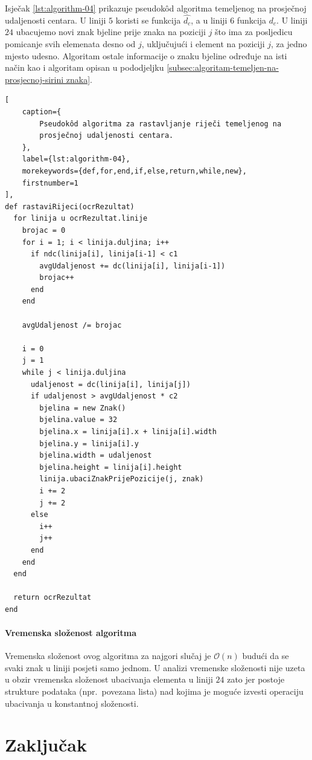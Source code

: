 \documentclass[times, utf8, zavrsni]{fer}
\begin{document}
Isječak \ref{lst:algorithm-04} prikazuje pseudokôd algoritma temeljenog na
prosječnoj udaljenosti centara. U liniji $5$ koristi se funkcija $\hat{d_c}$,
a u liniji $6$ funkcija $d_c$. U liniji $24$ ubacujemo novi znak bjeline prije
znaka na poziciji $j$ što ima za posljedicu pomicanje svih elemenata desno od
$j$, uključujući i element na poziciji $j$, za jedno mjesto udesno. Algoritam
ostale informacije o znaku bjeline određuje na isti način kao i algoritam
opisan u pododjeljku
\ref{subsec:algoritam-temeljen-na-prosjecnoj-sirini znaka}.

\begin{lstlisting}[
    caption={
        Pseudokôd algoritma za rastavljanje riječi temeljenog na
        prosječnoj udaljenosti centara.
    },
    label={lst:algorithm-04},
    morekeywords={def,for,end,if,else,return,while,new},
    firstnumber=1
],
def rastaviRijeci(ocrRezultat)
  for linija u ocrRezultat.linije
    brojac = 0
    for i = 1; i < linija.duljina; i++
      if ndc(linija[i], linija[i-1] < c1
        avgUdaljenost += dc(linija[i], linija[i-1])
        brojac++
      end
    end

    avgUdaljenost /= brojac

    i = 0
    j = 1
    while j < linija.duljina
      udaljenost = dc(linija[i], linija[j])
      if udaljenost > avgUdaljenost * c2
        bjelina = new Znak()
        bjelina.value = 32
        bjelina.x = linija[i].x + linija[i].width
        bjelina.y = linija[i].y
        bjelina.width = udaljenost
        bjelina.height = linija[i].height
        linija.ubaciZnakPrijePozicije(j, znak)
        i += 2
        j += 2
      else
        i++
        j++
      end
    end
  end

  return ocrRezultat
end
\end{lstlisting}


\subsubsection{Vremenska složenost algoritma}
Vremenska složenost ovog algoritma za najgori slučaj je $\mathcal{O}(n)$ budući
da se svaki znak u liniji posjeti samo jednom. U analizi vremenske složenosti nije uzeta u obzir vremenska složenost ubacivanja elementa u liniji $24$ zato jer postoje strukture podataka (npr.\ povezana lista) nad kojima je moguće izvesti operaciju ubacivanja u konstantnoj složenosti.
















\chapter{Zaključak}




\begin{sazetak}

\kljucnerijeci{}
\end{sazetak}

\begin{abstract}

\keywords{}
\end{abstract}
\end{document}
